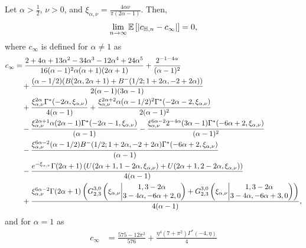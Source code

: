 \begin{theorem} \label{thm:clustering_coefficient_hyperbolic}
Let $\alpha > \frac{1}{2}$, $\nu > 0$, and $\xi_{\alpha,\nu} = \frac{4\alpha \nu}{\pi(2\alpha -1)}$. Then,
\[
	\lim_{n \to \infty} \Exp{\left|c_{\H,n} - c_\infty\right|} = 0,
\]
where $c_\infty$ is defined for $\alpha \ne 1$ as
\begin{align*}
	c_\infty 
	&=\frac{2 + 4 \alpha + 13 \alpha^2 - 34 \alpha^3 - 12\alpha^4 + 24 \alpha^5}
		{16(\alpha-1)^2 \alpha (\alpha+1) (2\alpha+1)} 
		+  \frac{2^{-1 - 4 \alpha}}{(\alpha - 1)^2} \\
	&\hspace{10pt}+ \frac{(\alpha - 1/2) (B(2 \alpha, 2 \alpha + 1) + B^-(1/2; 1 + 2 \alpha, -2 + 2 \alpha))}
		{2 (\alpha - 1) (3 \alpha - 1)} \\
	&\hspace{10pt}+ \frac{\xi_{\alpha,\nu}^{2\alpha} \Gamma^\ast( - 2 \alpha, \xi_{\alpha,\nu})}{4(\alpha-1)}
		+ \frac{\xi_{\alpha,\nu}^{2\alpha + 2}\alpha (\alpha - 1/2)^2 \Gamma^\ast(- 2 \alpha - 2, \xi_{\alpha,\nu})}
		{2(\alpha-1)^2} \\
	&\hspace{10pt}- \frac{\xi_{\alpha,\nu}^{2\alpha + 1}\alpha (2\alpha - 1) \Gamma^\ast( - 2 \alpha - 1,\xi_{\alpha,\nu})}{(\alpha-1)}
		- \frac{\xi_{\alpha,\nu}^{6\alpha-2}2^{-4\alpha}(3\alpha - 1)\Gamma^\ast( - 6 \alpha + 2, \xi_{\alpha,\nu})}{(\alpha-1)^2}\\
	&\hspace{10pt}-\frac{\xi_{\alpha,\nu}^{6\alpha - 2}(\alpha - 1/2) B^-(1/2; 1 + 2 \alpha, -2 + 2 \alpha)\Gamma^\ast( - 6 \alpha + 2, \xi_{\alpha,\nu})}{(\alpha-1)} \\
	&\hspace{10pt}- \frac{e^{-\xi_{\alpha,\nu}} \Gamma(2\alpha+1) 
		\left(U(2\alpha+1,1-2\alpha,\xi_{\alpha,\nu}) + U(2\alpha+1,2-2\alpha,\xi_{\alpha,\nu})\right)}{4(\alpha-1)} \\
	&\hspace{10pt}+ \frac{\xi_{\alpha,\nu}^{6\alpha - 2} \Gamma(2\alpha+1)\left( 	
		\MeijerGnew{3}{0}{2}{3}{1,3-2\alpha}{3-4\alpha,-6\alpha+2,0}{\xi_{\alpha,\nu}}
		+ \MeijerGnew{3}{0}{2}{3}{1,3-2\alpha}{3-4\alpha,-6\alpha+3,0}{\xi_{\alpha,\nu}}\right)}{4(\alpha-1)},
\end{align*}
and for $\alpha = 1$ as
\begin{align*}
	c_\infty &= \frac{575 - 12 \pi^2}{576} + \frac{\eta^4(7 + \pi^2)\Gamma^\ast(-4, \eta)}{4}\\

\end{align*}
\end{theorem}
